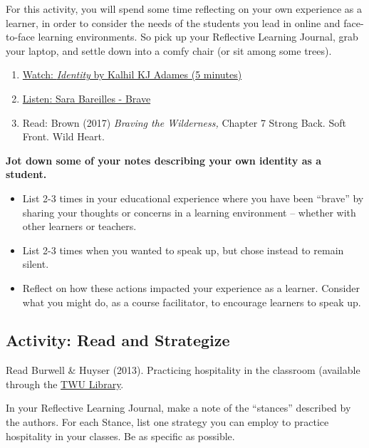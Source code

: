 \documentclass[
]{book}
\providecommand{\tightlist}{%
  \setlength{\itemsep}{0pt}\setlength{\parskip}{0pt}}
\begin{document}
\begin{reflect}
For this activity, you will spend some time reflecting on your own
experience as a learner, in order to consider the needs of the students
you lead in online and face-to-face learning environments. So pick up
your Reflective Learning Journal, grab your laptop, and settle down into
a comfy chair (or sit among some trees).

\begin{enumerate}
\def\labelenumi{\arabic{enumi}.}
\tightlist
\item
  \href{https://www.youtube.com/watch?v=ikGVWEvUzNM}{Watch:
  \emph{Identity} by Kalhil KJ Adames (5 minutes)}\\
\item
  \href{https://www.youtube.com/watch?v=QUQsqBqxoR4}{Listen: Sara
  Bareilles - Brave}\\
\item
  Read: Brown (2017) \emph{Braving the Wilderness,} Chapter 7 Strong
  Back. Soft Front. Wild Heart.
\end{enumerate}

\textbf{Jot down some of your notes describing your own identity as a
student.}

\begin{itemize}
\tightlist
\item
  List 2-3 times in your educational experience where you have been
  ``brave'' by sharing your thoughts or concerns in a learning
  environment -- whether with other learners or teachers.\\
\item
  List 2-3 times when you wanted to speak up, but chose instead to
  remain silent.\\
\item
  Reflect on how these actions impacted your experience as a learner.
  Consider what you might do, as a course facilitator, to encourage
  learners to speak up.
\end{itemize}
\end{reflect}

\hypertarget{activity-read-and-strategize}{%
\subsection*{Activity: Read and Strategize}\label{activity-read-and-strategize}}

\begin{reflect}
Read Burwell \& Huyser (2013). Practicing hospitality in the classroom
(available through the \href{https://www.twu.ca/library}{TWU Library}.

In your Reflective Learning Journal, make a note of the ``stances''
described by the authors. For each Stance, list one strategy you can
employ to practice hospitality in your classes. Be as specific as
possible.
\end{reflect}
\end{document}
